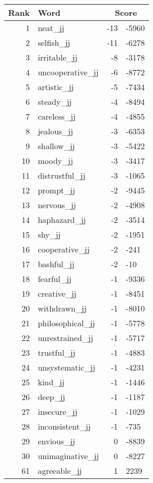 \begin{longtable}[!htbp]{| rlr@{.}l |}
    \hline
    \textbf{Rank} & \textbf{Word} & \multicolumn{2}{c|}{\textbf{Score}} \\
    \hline
    \endhead
    1 & neat\_jj & -13 & -5960 \\
    2 & selfish\_jj & -11 & -6278 \\
    3 & irritable\_jj & -8 & -3178 \\
    4 & uncooperative\_jj & -6 & -8772 \\
    5 & artistic\_jj & -5 & -7434 \\
    6 & steady\_jj & -4 & -8494 \\
    7 & careless\_jj & -4 & -4855 \\
    8 & jealous\_jj & -3 & -6353 \\
    9 & shallow\_jj & -3 & -5422 \\
    10 & moody\_jj & -3 & -3417 \\
    11 & distrustful\_jj & -3 & -1065 \\
    12 & prompt\_jj & -2 & -9445 \\
    13 & nervous\_jj & -2 & -4908 \\
    14 & haphazard\_jj & -2 & -3514 \\
    15 & shy\_jj & -2 & -1951 \\
    16 & cooperative\_jj & -2 & -241 \\
    17 & bashful\_jj & -2 & -10 \\
    18 & fearful\_jj & -1 & -9336 \\
    19 & creative\_jj & -1 & -8451 \\
    20 & withdrawn\_jj & -1 & -8010 \\
    21 & philosophical\_jj & -1 & -5778 \\
    22 & unrestrained\_jj & -1 & -5717 \\
    23 & trustful\_jj & -1 & -4883 \\
    24 & unsystematic\_jj & -1 & -4231 \\
    25 & kind\_jj & -1 & -1446 \\
    26 & deep\_jj & -1 & -1187 \\
    27 & insecure\_jj & -1 & -1029 \\
    28 & inconsistent\_jj & -1 & -735 \\
    29 & envious\_jj & 0 & -8839 \\
    30 & unimaginative\_jj & 0 & -8227 \\
    61 & agreeable\_jj & 1 & 2239 \\

\end{longtable}
